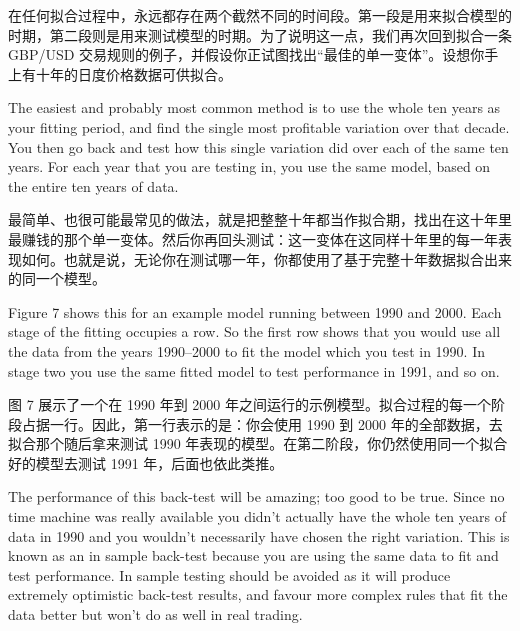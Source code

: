 \begin{chineseblock}在任何拟合过程中，永远都存在两个截然不同的时间段。第一段是用来拟合模型的时期，第二段则是用来测试模型的时期。为了说明这一点，我们再次回到拟合一条 GBP/USD 交易规则的例子，并假设你正试图找出“最佳的单一变体”。设想你手上有十年的日度价格数据可供拟合。\end{chineseblock}

\bipairgap

\begin{englishblock} The easiest and probably most common method is to use the whole ten years as your fitting period, and find the single most profitable variation over that decade. You then go back and test how this single variation did over each of the same ten years. For each year that you are testing in, you use the same model, based on the entire ten years of data. \end{englishblock}

\begin{chineseblock}最简单、也很可能最常见的做法，就是把整整十年都当作拟合期，找出在这十年里最赚钱的那个单一变体。然后你再回头测试：这一变体在这同样十年里的每一年表现如何。也就是说，无论你在测试哪一年，你都使用了基于完整十年数据拟合出来的同一个模型。\end{chineseblock}

\bipairgap

\begin{englishblock} Figure 7 shows this for an example model running between 1990 and 2000. Each stage of the fitting occupies a row. So the first row shows that you would use all the data from the years 1990--2000 to fit the model which you test in 1990. In stage two you use the same fitted model to test performance in 1991, and so on. \end{englishblock}

\begin{chineseblock}图 7 展示了一个在 1990 年到 2000 年之间运行的示例模型。拟合过程的每一个阶段占据一行。因此，第一行表示的是：你会使用 1990 到 2000 年的全部数据，去拟合那个随后拿来测试 1990 年表现的模型。在第二阶段，你仍然使用同一个拟合好的模型去测试 1991 年，后面也依此类推。\end{chineseblock}

\bipairgap

\begin{englishblock} The performance of this back-test will be amazing; too good to be true. Since no time machine was really available you didn't actually have the whole ten years of data in 1990 and you wouldn't necessarily have chosen the right variation. This is known as an in sample back-test because you are using the same data to fit and test performance. In sample testing should be avoided as it will produce extremely optimistic back-test results, and favour more complex rules that fit the data better but won't do as well in real trading. \end{englishblock}

